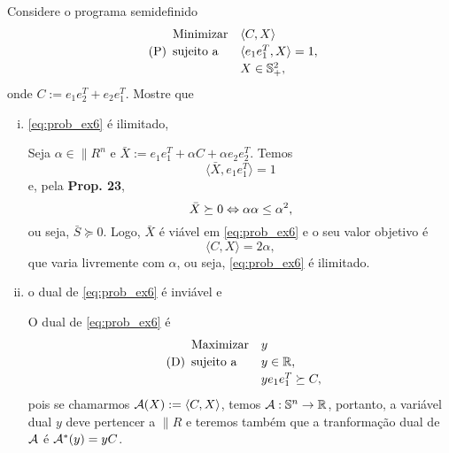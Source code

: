 \begin{homeworkProblem}
Considere o programa semidefinido
\begin{equation} \tag{P} \label{eq:prob_ex6}
    \begin{array}[!h]{lll}
        \text{Minimizar} & \langle C, X \rangle                                                      & \\[2pt]
        \text{sujeito a} & \langle e_1e_1^T, X \rangle = 1,                                          & \\[2pt]
                         & X \in \|{S}_+^2,                                                          & \\
    \end{array}
\end{equation}
onde $C := e_1e_2^T + e_2e_1^T$. Mostre que

\begin{enumerate}[(i)]

\item \eqref{eq:prob_ex6} é ilimitado,
\begin{homeworkProblemAnswer}
Seja $\alpha \in \|{R}^n$ e $\bar{X} := e_1e_1^T + \alpha C + \alpha e_2e_2^T$. Temos
$$\langle \bar{X}, e_1e_1^T \rangle = 1$$
e, pela \textbf{Prop. 23}, 
$$\bar{X} \succeq 0 \sse \alpha \alpha \leq \alpha^2,$$
ou seja, $\bar{S} \succeq 0$. Logo, $\bar{X}$ é viável em \eqref{eq:prob_ex6} e o seu valor objetivo é
$$ \langle C, X \rangle = 2 \alpha, $$
que varia livremente com $\alpha$, ou seja, \eqref{eq:prob_ex6} é ilimitado.
\end{homeworkProblemAnswer}

\item o dual de \eqref{eq:prob_ex6} é inviável e
\begin{homeworkProblemAnswer}
O dual de \eqref{eq:prob_ex6} é
\begin{equation} \tag{D} \label{eq:dual_ex6}
    \begin{array}[!h]{lll}
        \text{Maximizar} & y                                                                         & \\[2pt]
        \text{sujeito a} & y \in \|{R},                                                              & \\[2pt]
                         & ye_1e_1^T \succeq C,                                                  & \\
    \end{array}
\end{equation}
pois se chamarmos $\"{A}(X) := \langle C, X \rangle$, temos $\"{A} : \|{S}^n \rightarrow \|{R}$, portanto, a variável dual $y$ deve pertencer a $\|{R}$ e teremos também que a tranformação dual de $\"{A}$ é $\"{A}^*(y) = yC$.  


\end{homeworkProblemAnswer}
\end{enumerate}
\end{homeworkProblem}
